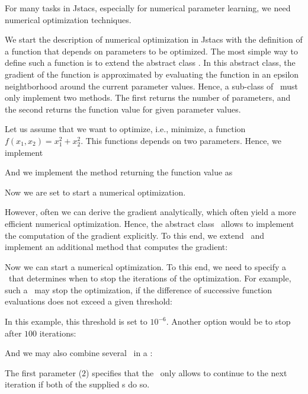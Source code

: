 \setcounter{off}{478}

For many tasks in Jstacs, especially for numerical parameter learning, we need numerical optimization techniques.

We start the description of numerical optimization in Jstacs with the definition of a function that depends on parameters to be optimized. The most simple way to define such a function is to extend the abstract class \NumericalDifferentiableFunction. In this abstract class, the gradient of the function is approximated by evaluating the function in an epsilon neightborhood around the current parameter values. Hence, a sub-class of \NumericalDifferentiableFunction~must only implement two methods. The first returns the number of parameters, and the second returns the function value for given parameter values.

Let us assume that we want to optimize, i.e., minimize, a function $f(x_1,x_2)=x_1^2 + x_2^2$. This functions depends on two parameters. Hence, we implement
\addtocounter{off}{6}
And we implement the method returning the function value as
\addtocounter{off}{5}
Now we are set to start a numerical optimization.

However, often we can derive the gradient analytically, which often yield a more efficient numerical optimization. Hence, the abstract class \DifferentiableFunction~allows to implement the computation of the gradient explicitly. To this end, we extend \DifferentiableFunction~and implement an additional method that computes the gradient:
\addtocounter{off}{19}

Now we can start a numerical optimization. To this end, we need to specify a \TerminationCondition~that determines when to stop the iterations of the optimization. For example, such a \TerminationCondition~may stop the optimization, if the difference of successive function evaluations does not exceed a given threshold:
\addtocounter{off}{7}
In this example, this threshold is set to $10^{-6}$. Another option would be to stop after $100$ iterations:
\addtocounter{off}{1}

And we may also combine several \TerminationCondition~in a \CombinedCondition:
\addtocounter{off}{3}
The first parameter ($2$) specifies that the \CombinedCondition~only allows to continue to the next iteration if both of the supplied \TerminationCondition s do so. 

